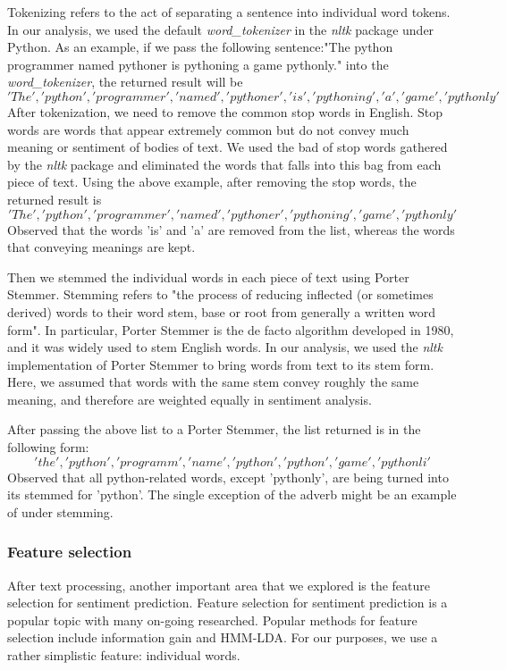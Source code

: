 \documentclass{article}
\begin{document}
Tokenizing refers to the act of separating a sentence into individual word tokens. In our analysis, we used the default \textit{word\_tokenizer} in the \textit{nltk} package under Python. As an example, if we pass the following sentence:"The python programmer named pythoner is pythoning a game pythonly." into the \textit{word\_tokenizer}, the returned result will be 
\['The','python','programmer', 'named', 'pythoner', 'is', 'pythoning', 'a', 'game', 'pythonly'\] 
After tokenization, we need to remove the common stop words in English. Stop words are words that appear extremely common but do not convey much meaning or sentiment of bodies of text. We used the bad of stop words gathered by the \textit{nltk} package and eliminated the words that falls into this bag from each piece of text. Using the above example, after removing the stop words, the returned result is 
\['The','python','programmer', 'named', 'pythoner', 'pythoning', 'game', 'pythonly'\] 
Observed that the words 'is' and 'a' are removed from the list, whereas the words that conveying meanings are kept. 

Then we stemmed the individual words in each piece of text using Porter Stemmer. Stemming refers to "the process of reducing inflected (or sometimes derived) words to their word stem, base or root from generally a written word form". In particular, Porter Stemmer is the de facto algorithm developed in 1980, and it was widely used to stem English words. In our analysis, we used the \textit{nltk} implementation of Porter Stemmer to bring words from text to its stem form. Here, we assumed that words with the same stem convey roughly the same meaning, and therefore are weighted equally in sentiment analysis. 

After passing the above list to a Porter Stemmer, the list returned is in the following form: 
\['the','python','programm', 'name', 'python', 'python', 'game', 'pythonli'\]
Observed that all python-related words, except 'pythonly', are being turned into its stemmed for 'python'. The single exception of the adverb might be an example of under stemming. 

\subsubsection{Feature selection}
After text processing, another important area that we explored is the feature selection for sentiment prediction. Feature selection for sentiment prediction is a popular topic with many on-going researched. Popular methods for feature selection include information gain and HMM-LDA. For our purposes, we use a rather simplistic feature: individual words.
\end{document}
